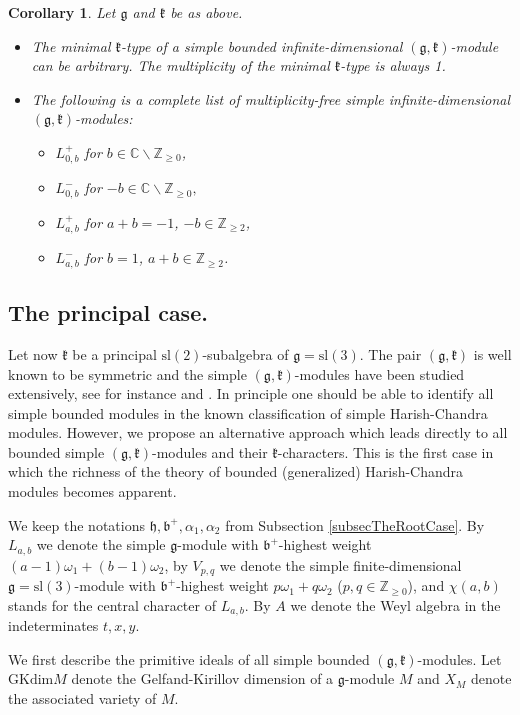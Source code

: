 \documentclass[12pt]{amsart}
\theoremstyle{plain} %
\newtheorem{corollary}[definition]{Corollary}
\renewcommand{\sl}{\mathrm{sl}}
\newcommand {\ZZ} {\mathbb {Z}}
\newcommand {\CC} {\mathbb {C}}
\newcommand{\kk}{\mathfrak{k}}
\newcommand{\hh}{\mathfrak{h}}
\renewcommand{\gg}{\mathfrak{g}}
\newcommand{\bb}{\mathfrak{b}}
\begin{document}
\begin{corollary}
Let $\gg$ and $\kk$ be as above.
\begin{itemize}
\item[(a)] The minimal $\kk$-type of a simple bounded infinite-dimensional $(\gg,\kk)$-module can be arbitrary. The multiplicity of the minimal $\kk$-type is always 1.
\item[(b)] The following is a complete list of multiplicity-free simple infinite-dimensional $(\gg,\kk)$-modules:
\begin{itemize}
\item $L_{0,b}^+$ for $b\in\CC\backslash \ZZ_{\geq 0}$,
\item $L_{0,b}^-$ for $-b\in\CC\backslash \ZZ_{\geq 0},$
\item $L_{a,b}^+$ for $a+b=-1$, $-b\in \ZZ_{\geq 2}$,
\item $L_{a,b}^-$ for $b=1$, $a+b\in \ZZ_{\geq 2}$.
\end{itemize}
\end{itemize}
\end{corollary}

\subsection{The principal case.}
Let now $\kk$ be a principal $\sl(2)$-subalgebra of $\gg=\sl(3)$. 
The pair $(\gg,\kk)$ is well known to be symmetric and 
the simple $(\gg,\kk)$-modules have been studied extensively, see for
instance \cite{Fo} and \cite{Sp}. In principle one should be able to
identify all simple bounded modules in the known classification of
simple Harish-Chandra modules. However, we propose an alternative
approach which leads directly to all bounded simple
$(\gg,\kk)$-modules and their $\kk$-characters.  This is the first
case in which the richness of the theory of bounded (generalized)
Harish-Chandra modules becomes apparent.


We keep the notations $\hh,\bb^+, \alpha_1, \alpha_2$ from Subsection
\ref{subsecTheRootCase}. By $L_{a,b}$ we denote the simple
$\gg$-module with $\bb^+$-highest weight
$(a-1)\omega_1+(b-1)\omega_2$, by $V_{p,q}$ we denote the simple
finite-dimensional $\gg=\sl(3)$-module with $\bb^+$-highest weight
$p\omega_1+q\omega_2$ ($p,q\in\ZZ_{\geq 0}$), and $\chi(a,b)$ stands
for the central character of $L_{a,b}$. By $A$ we denote the Weyl algebra in the indeterminates $t,x,y$.

We first describe the primitive ideals of all simple bounded
$(\gg,\kk)$-modules. Let $\mathrm{GKdim}M$ denote the Gelfand-Kirillov
dimension of a $\gg$-module $M$ and $X_M$ denote the associated
variety of $M$.
\end{document}
